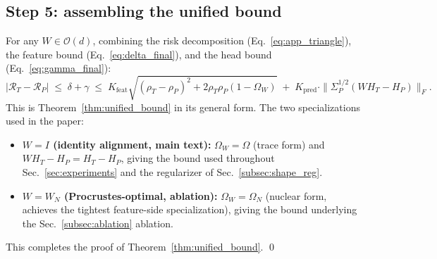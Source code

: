 \subsection{Step 5: assembling the unified bound}
\label{app:assembly}

For any $W \in \mathcal{O}(d)$, combining the risk decomposition (Eq.~\ref{eq:app_triangle}), the feature bound (Eq.~\ref{eq:delta_final}), and the head bound (Eq.~\ref{eq:gamma_final}):
\begin{equation}
|\mathcal{R}_T - \mathcal{R}_P| \;\le\; \delta + \gamma \;\le\; K_{\mathrm{feat}} \sqrt{(\rho_T - \rho_P)^2 + 2\rho_T\rho_P(1 - \Omega_W)} \;+\; K_{\mathrm{pred}} \cdot \|\Sigma_P^{1/2}(W H_T - H_P)\|_F.
\end{equation}
This is Theorem~\ref{thm:unified_bound} in its general form. The two specializations used in the paper:
\begin{itemize}
    \item \textbf{$W = I$ (identity alignment, main text):} $\Omega_W = \Omega$ (trace form) and $W H_T - H_P = H_T - H_P$, giving the bound used throughout Sec.~\ref{sec:experiments} and the regularizer of Sec.~\ref{subsec:shape_reg}.
    \item \textbf{$W = W_N$ (Procrustes-optimal, ablation):} $\Omega_W = \Omega_N$ (nuclear form, achieves the tightest feature-side specialization), giving the bound underlying the Sec.~\ref{subsec:ablation} ablation.
\end{itemize}
This completes the proof of Theorem~\ref{thm:unified_bound}. \qed

